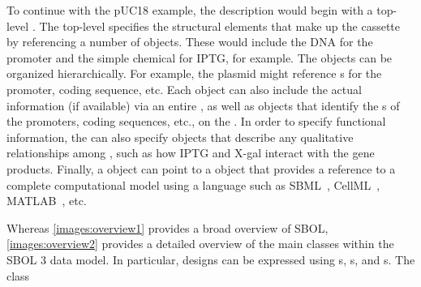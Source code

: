 To continue with the pUC18 example, the description would begin with a top-level .  The top-level  specifies the structural elements that make up the cassette by referencing a number of  objects. These would include the DNA  for the promoter and the simple chemical
 for IPTG, for example.  The  objects can be organized hierarchically.  For example, the plasmid  might reference s for the promoter, coding sequence, etc.  Each  object can also include the actual  information (if available) via an entire  , as well as  objects that identify the s of the promoters, coding sequences, etc., on the .  In order to specify functional information, the  can also specify  objects that describe any qualitative relationships among  , such as how IPTG and X-gal interact with the gene products.  Finally, a  object can point to a  object that provides a reference to a complete computational model using a language such as SBML~\cite{SBML}, CellML~\cite{CellML}, MATLAB~\cite{matlab}, etc.

Whereas \ref{images:overview1} provides a broad overview of SBOL, \ref{images:overview2} provides a detailed overview of the main classes within the SBOL 3 data model.  In particular, designs can be expressed using s, s, and s.  The  class 


